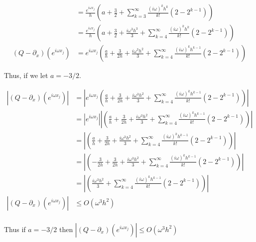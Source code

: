 \documentclass[11pt]{amsart}
\numberwithin{equation}{section}
\begin{document}
{\begin{align}
                                      & = \frac{e^{i\omega x_j}}{h} \left(a + \frac{3}{2} + \sum_{k=3}^\infty \frac{(i\omega)^k h^k}{k!} \left(2 - 2^{k-1} \right) \right)                                                                        \\
                                      & = \frac{e^{i\omega x_j}}{h} \left(a + \frac{3}{2} + \frac{i\omega^3 h^3}{3} + \sum_{k=4}^\infty \frac{(i\omega)^k h^k}{k!} \left(2 - 2^{k-1} \right) \right)                                              \\
    (Q - \partial_x)(e^{i\omega x_j}) & = e^{i\omega x_j} \left(\frac{a}{h} + \frac{3}{2h} + \frac{i\omega^3 h^2}{3} + \sum_{k=4}^\infty \frac{(i\omega)^k h^{k-1}}{k!} \left(2 - 2^{k-1} \right) \right)
\end{align}

Thus, if we let $a = -3/2$.

\begin{align}
    |(Q - \partial_x)(e^{i\omega x_j})| & = \left|e^{i\omega x_j} \left(\frac{a}{h} + \frac{3}{2h} + \frac{i\omega^3 h^2}{3} + \sum_{k=4}^\infty \frac{(i\omega)^k h^{k-1}}{k!} \left(2 - 2^{k-1} \right) \right) \right|                \\
                                        & = \left|e^{i\omega x_j} \right| \left| \left(\frac{a}{h} + \frac{3}{2h} + \frac{i\omega^3 h^2}{3} + \sum_{k=4}^\infty \frac{(i\omega)^k h^{k-1}}{k!} \left(2 - 2^{k-1} \right) \right) \right| \\
                                        & = \left| \left(\frac{a}{h} + \frac{3}{2h} + \frac{i\omega^3 h^2}{3} + \sum_{k=4}^\infty \frac{(i\omega)^k h^{k-1}}{k!} \left(2 - 2^{k-1} \right) \right) \right|                               \\
                                        & = \left| \left(-\frac{3}{2h} + \frac{3}{2h} + \frac{i\omega^3 h^2}{3} + \sum_{k=4}^\infty \frac{(i\omega)^k h^{k-1}}{k!} \left(2 - 2^{k-1} \right) \right) \right|                             \\
                                        & = \left| \left(\frac{i\omega^3 h^2}{3} + \sum_{k=4}^\infty \frac{(i\omega)^k h^{k-1}}{k!} \left(2 - 2^{k-1} \right) \right) \right|                                                            \\
    |(Q - \partial_x)(e^{i\omega x_j})| & \le O(\omega^3 h^2)                                                                                                                                                                            \\
\end{align}

Thus if $a = -3/2$ then $|(Q - \partial_x)(e^{i\omega x_j})| \le O(\omega^3 h^2)$

}
\end{document}

